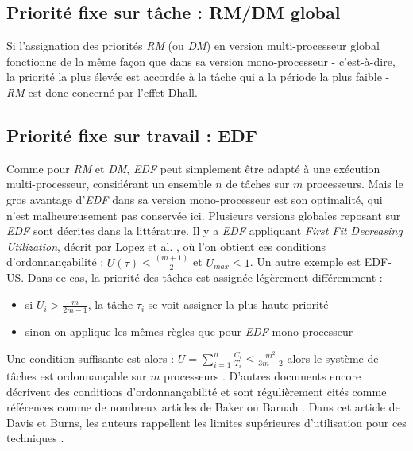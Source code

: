 	
	
	\subsection{Priorité fixe sur tâche : RM/DM global}
	Si l'assignation des priorités \textit{RM} (ou \textit{DM}) en version multi-processeur global 
	fonctionne de la même façon que dans sa version mono-processeur - 
	c'est-à-dire, la priorité la plus élevée est accordée à la tâche qui a la période la plus faible - 
	\textit{RM} est donc concerné par l'effet Dhall. \medskip
	
	
	\subsection{Priorité fixe sur travail : EDF}
	Comme pour \textit{RM} et \textit{DM}, \textit{EDF} peut simplement être adapté à une exécution multi-processeur, 
	considérant un ensemble $n$ de tâches sur $m$ processeurs. Mais le gros avantage d'\textit{EDF} 
	dans sa version mono-processeur est son optimalité, qui n'est malheureusement pas conservée ici. 
	Plusieurs versions globales reposant sur \textit{EDF} sont décrites dans la littérature. 
	Il y a \textit{EDF} appliquant \textit{First Fit Decreasing Utilization}, décrit par 
	Lopez et al. \cite{lopez_utilization_2004}, où l'on obtient ces conditions d'ordonnançabilité : \newline
	$U(\tau) \leq \frac{(m + 1)}{2}$ et $U_{max} \leq 1$. \newline
	Un autre exemple est EDF-US. 
	Dans ce cas, la priorité des tâches est assignée légèrement différemment :\medskip
	\begin{itemize}
		\item si $U_i > \frac{m}{2m-1}$, la tâche $\tau_i$ se voit assigner la plus haute priorité
		\item sinon on applique les mêmes règles que pour \textit{EDF} mono-processeur
	\end{itemize}
	Une condition suffisante est alors :\newline
	$U = \sum_{i=1}^{n}\frac{C_i}{T_i} \leq \frac{m^2}{3m-2}$
	alors le système de tâches est ordonnançable sur $m$ processeurs
	\cite{andersson_static-priority_2001}. \medskip
	D'autres documents encore décrivent des conditions d'ordonnançabilité et sont régulièrement 
	cités comme références comme de nombreux articles de Baker 
	\cite{baker_multiprocessor_2003} \cite{baker_analysis_2005} ou Baruah \cite{baruah_optimal_2004}
	\cite{baruah_schedulability_2008}. 
	Dans cet article de Davis et Burns, les auteurs rappellent les 
	limites supérieures d'utilisation pour ces techniques \cite{davis_survey_2011}.\medskip
	
